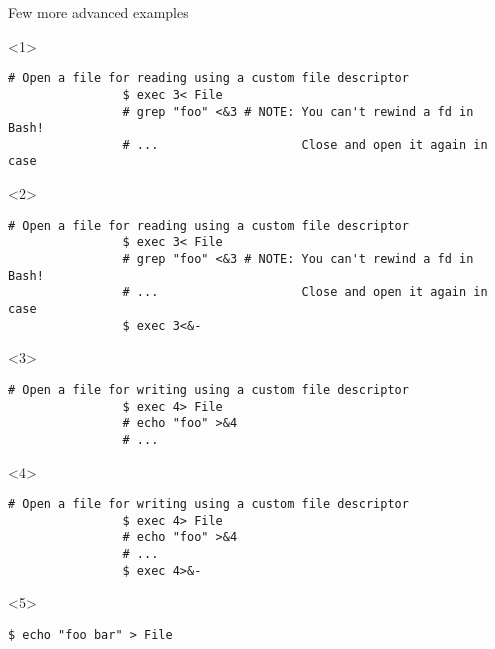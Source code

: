 \begin{frame}[fragile]{Few more advanced examples}
    \vspace{-5mm}
    \begin{overlayarea}{\textwidth}{0.38\textheight}
        \begin{onlyenv}<1>
            \begin{lstlisting}[style=MyBash, numbers=none, xrightmargin=3mm]
                # Open a file for reading using a custom file descriptor
                $ exec 3< File
                # grep "foo" <&3 # NOTE: You can't rewind a fd in Bash!
                # ...                    Close and open it again in case
            \end{lstlisting}
        \end{onlyenv}
        \begin{onlyenv}<2>
            \begin{lstlisting}[style=MyBash, numbers=none, xrightmargin=3mm]
                # Open a file for reading using a custom file descriptor
                $ exec 3< File
                # grep "foo" <&3 # NOTE: You can't rewind a fd in Bash!
                # ...                    Close and open it again in case
                $ exec 3<&-
            \end{lstlisting}
        \end{onlyenv}
        \begin{onlyenv}<3>
            \begin{lstlisting}[style=MyBash, numbers=none, xrightmargin=3mm]
                # Open a file for writing using a custom file descriptor
                $ exec 4> File
                # echo "foo" >&4 
                # ...
            \end{lstlisting}
        \end{onlyenv}
        \begin{onlyenv}<4>
            \begin{lstlisting}[style=MyBash, numbers=none, xrightmargin=3mm]
                # Open a file for writing using a custom file descriptor
                $ exec 4> File
                # echo "foo" >&4 
                # ...
                $ exec 4>&-
            \end{lstlisting}
        \end{onlyenv}
        \begin{onlyenv}<5>
            \begin{lstlisting}[style=MyBash, numbers=none, xrightmargin=3mm]
                $ echo "foo bar" > File

\end{lstlisting}
\end{onlyenv}
\end{overlayarea}
\end{frame}
